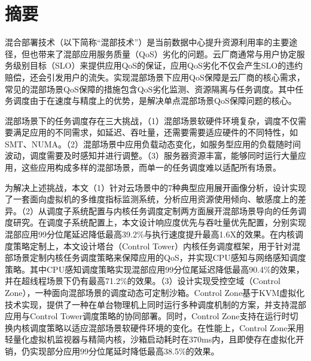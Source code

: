 
\maketitle%
\MAKETITLE%
\makedeclaration%
\intobmk\chapter*{摘\quad 要}%
\setcounter{page}{1}%


混合部署技术（以下简称“混部技术”）是当前数据中心提升资源利用率的主要途径，但也带来了混部应用服务质量（QoS）劣化的问题。云厂商通常与用户协定服务级别目标（SLO）来提供应用QoS的保证，应用QoS劣化不仅会产生SLO的违约赔偿，还会引发用户的流失。实现混部场景下应用QoS保障是云厂商的核心需求，常见的混部场景QoS保障的措施包含QoS劣化监测、资源隔离与任务调度。其中任务调度由于在速度与精度上的优势，是解决单点混部场景QoS保障问题的核心。

混部场景下的任务调度存在三大挑战，（1）混部场景软硬件环境复杂，调度不仅需要满足应用的不同需求，如延迟、吞吐量，还需要需要适应硬件的不同特性，如SMT、NUMA。（2）混部场景中应用负载动态变化，如服务型应用的负载随时间波动，调度需要及时感知并进行调整。（3）服务器资源丰富，能够同时运行大量应用，这些应用构成多样的混部场景，而单一的任务调度难以适配所有场景。

为解决上述挑战，本文（1）针对云场景中的7种典型应用展开画像分析，设计实现了一套面向虚拟机的多维度指标监测系统，分析应用资源使用倾向、敏感度上的差异。（2）从调度子系统配置与内核任务调度定制两方面展开混部场景导向的任务调度研究。在调度子系统配置上，本文设计响应度优先与吞吐量优先配置，分别实现混部应用99分位尾延迟降低最高39.2\%与执行速度提升最高1.6X的效果。在内核调度策略定制上，本文设计塔台（Control Tower）内核任务调度框架，用于针对混部场景定制内核任务调度策略来保障应用的QoS，并实现CPU感知与网络感知调度策略。其中CPU感知调度策略实现混部应用99分位尾延迟降低最高90.4\%的效果，并在超线程场景下仍有最高71.2\%的效果。（3）设计实现受控空域（Control Zone），一种面向混部场景的调度动态可定制沙箱。Control Zone基于KVM虚拟化技术实现，提供了一种在单台物理机上同时运行多种调度机制的方案，并支持混部应用与Control Tower调度策略的协同部署。同时，Control Zone支持在运行时切换内核调度策略以适应混部场景软硬件环境的变化。在性能上，Control Zone采用轻量化虚拟机监视器与精简内核，沙箱启动耗时在370ms内，且即使存在虚拟化开销，仍实现部分应用99分位尾延时降低最高38.5\%的效果。

